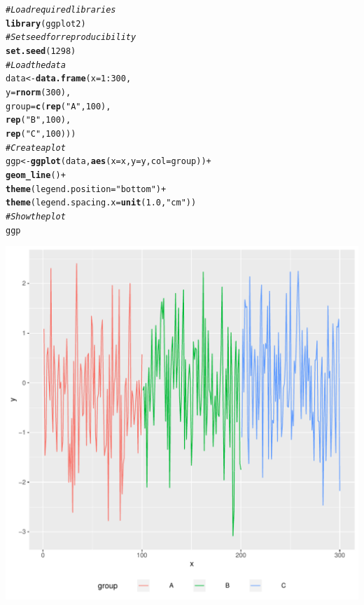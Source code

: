 \documentclass{article}\usepackage[]{graphicx}\usepackage[]{xcolor}
\makeatletter
\def\maxwidth{ %
  \ifdim\Gin@nat@width>\linewidth
    \linewidth
  \else
    \Gin@nat@width
  \fi
}
\newcommand{\hlnum}[1]{\textcolor[rgb]{0.686,0.059,0.569}{#1}}%
\newcommand{\hlstr}[1]{\textcolor[rgb]{0.192,0.494,0.8}{#1}}%
\newcommand{\hlcom}[1]{\textcolor[rgb]{0.678,0.584,0.686}{\textit{#1}}}%
\newcommand{\hlopt}[1]{\textcolor[rgb]{0,0,0}{#1}}%
\newcommand{\hlstd}[1]{\textcolor[rgb]{0.345,0.345,0.345}{#1}}%
\newcommand{\hlkwb}[1]{\textcolor[rgb]{0.69,0.353,0.396}{#1}}%
\newcommand{\hlkwc}[1]{\textcolor[rgb]{0.333,0.667,0.333}{#1}}%
\newcommand{\hlkwd}[1]{\textcolor[rgb]{0.737,0.353,0.396}{\textbf{#1}}}%
\newenvironment{kframe}{%
 \def\at@end@of@kframe{}%
 \ifinner\ifhmode%
  \def\at@end@of@kframe{\end{minipage}}%
  \begin{minipage}{\columnwidth}%
 \fi\fi%
 \def\FrameCommand##1{\hskip\@totalleftmargin \hskip-\fboxsep
 \colorbox{shadecolor}{##1}\hskip-\fboxsep
     \hskip-\linewidth \hskip-\@totalleftmargin \hskip\columnwidth}%
 \MakeFramed {\advance\hsize-\width
   \@totalleftmargin\z@ \linewidth\hsize
   \@setminipage}}%
 {\par\unskip\endMakeFramed%
 \at@end@of@kframe}
\newenvironment{knitrout}{}{} %
\makeatother
\begin{document}
\begin{knitrout}
\color{fgcolor}\begin{kframe}
\begin{alltt}
\hlcom{# Load required libraries}
\hlkwd{library}\hlstd{(ggplot2)}
\hlcom{# Set seed for reproducibility}
\hlkwd{set.seed}\hlstd{(}\hlnum{1298}\hlstd{)}
\hlcom{# Load the data}
\hlstd{data} \hlkwb{<-} \hlkwd{data.frame}\hlstd{(} \hlkwc{x} \hlstd{=} \hlnum{1}\hlopt{:}\hlnum{300}\hlstd{,}
                    \hlkwc{y} \hlstd{=} \hlkwd{rnorm}\hlstd{(} \hlnum{300} \hlstd{),}
                    \hlkwc{group} \hlstd{=} \hlkwd{c}\hlstd{(} \hlkwd{rep}\hlstd{(} \hlstr{"A"} \hlstd{,} \hlnum{100} \hlstd{),}
                               \hlkwd{rep}\hlstd{(} \hlstr{"B"} \hlstd{,} \hlnum{100} \hlstd{),}
                               \hlkwd{rep}\hlstd{(} \hlstr{"C"} \hlstd{,} \hlnum{100} \hlstd{) ) )}
\hlcom{# Create a plot}
\hlstd{ggp} \hlkwb{<-} \hlkwd{ggplot}\hlstd{( data ,} \hlkwd{aes}\hlstd{(} \hlkwc{x} \hlstd{= x ,} \hlkwc{y} \hlstd{= y ,} \hlkwc{col} \hlstd{= group ) )} \hlopt{+}
  \hlkwd{geom_line}\hlstd{()} \hlopt{+}
  \hlkwd{theme}\hlstd{(} \hlkwc{legend.position} \hlstd{=} \hlstr{"bottom"} \hlstd{)} \hlopt{+}
  \hlkwd{theme}\hlstd{(} \hlkwc{legend.spacing.x} \hlstd{=} \hlkwd{unit}\hlstd{(} \hlnum{1.0} \hlstd{,} \hlstr{"cm"} \hlstd{) )}
\hlcom{# Show the plot}
\hlstd{ggp}
\end{alltt}
\end{kframe}
\includegraphics[width=\maxwidth]{figure/unnamed-chunk-1-1} 
\end{knitrout}
\end{document}
